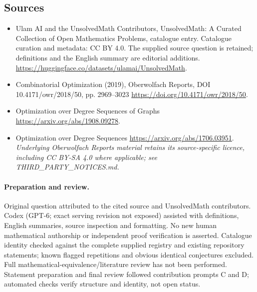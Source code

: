 \documentclass[11pt]{article}
\begin{document}
\subsection{Sources}
\begin{itemize}
\item[\hypertarget{source:statement:1}{S1}] Ulam AI and the UnsolvedMath Contributors, UnsolvedMath: A Curated Collection of Open Mathematics Problems, catalogue entry. Catalogue curation and metadata: CC BY 4.0. The supplied source question is retained; definitions and the English summary are editorial additions.
\url{https://huggingface.co/datasets/ulamai/UnsolvedMath}.
\item[\hypertarget{source:statement:2}{S2}] Combinatorial Optimization (2019), Oberwolfach Reports, DOI 10.4171/owr/2018/50, pp. 2969--3023
\url{https://doi.org/10.4171/owr/2018/50}.
\item[\hypertarget{source:statement:3}{S3}] Optimization over Degree Sequences of Graphs
\url{https://arxiv.org/abs/1908.09278}.
\item[\hypertarget{source:statement:4}{S4}] Optimization over Degree Sequences
\url{https://arxiv.org/abs/1706.03951}.
\textit{Underlying Oberwolfach Reports material retains its source-specific licence, including CC BY-SA 4.0 where applicable; see THIRD\_PARTY\_NOTICES.md.}
\end{itemize}
\paragraph{Preparation and review.}
Original question attributed to the cited source and UnsolvedMath contributors. Codex (GPT-6; exact serving revision not exposed) assisted with definitions, English summaries, source inspection and formatting. No new human mathematical authorship or independent proof verification is asserted. Catalogue identity checked against the complete supplied registry and existing repository statements; known flagged repetitions and obvious identical conjectures excluded. Full mathematical-equivalence/literature review has not been performed. Statement preparation and final review followed contribution prompts C and D; automated checks verify structure and identity, not open status.
\label{end:statement}
\end{document}
